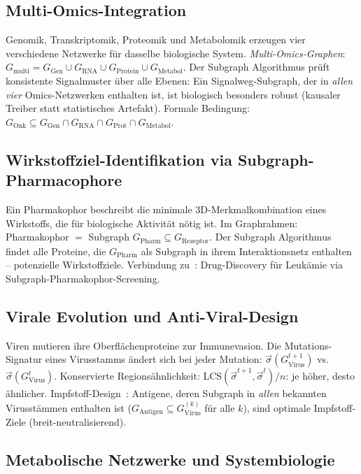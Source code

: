 ﻿\documentclass[a4paper,12pt]{article}
\theoremstyle{plain}
\theoremstyle{definition}
\theoremstyle{remark}
\newcommand{\sigvec}{\vec{\sigma}}
\begin{document}
\subsection{Multi-Omics-Integration}

Genomik, Transkriptomik, Proteomik und Metabolomik erzeugen vier
verschiedene Netzwerke f\"ur dasselbe biologische System.
\emph{Multi-Omics-Graphen}: $G_{\mathrm{multi}} = G_{\mathrm{Gen}} \cup
G_{\mathrm{RNA}} \cup G_{\mathrm{Protein}} \cup G_{\mathrm{Metabol}}$.
Der Subgraph Algorithmus pr\"uft konsistente Signalmuster \"uber alle Ebenen:
Ein Signalweg-Subgraph, der in \emph{allen vier} Omics-Netzwerken
enthalten ist, ist biologisch besonders robust (kausaler Treiber statt
statistisches Artefakt).
Formale Bedingung:
$G_{\mathrm{Onk}} \subseteq G_{\mathrm{Gen}} \cap G_{\mathrm{RNA}} \cap
G_{\mathrm{Prot}} \cap G_{\mathrm{Metabol}}$.

\subsection{Wirkstoffziel-Identifikation via Subgraph-Pharmacophore}

Ein Pharmakophor beschreibt die minimale 3D-Merkmalkombination eines
Wirkstoffs, die f\"ur biologische Aktivit\"at n\"otig ist.
Im Graphrahmen: Pharmakophor $= $ Subgraph $G_{\mathrm{Pharm}} \subseteq G_{\mathrm{Rezeptor}}$.
Der Subgraph Algorithmus findet alle Proteine, die $G_{\mathrm{Pharm}}$
als Subgraph in ihrem Interaktionsnetz enthalten -- potenzielle Wirkstoffziele.
Verbindung zu~\cite{epp2026gen,epp2026bloodc}: Drug-Discovery f\"ur
Leukämie via Subgraph-Pharmakophor-Screening.

\subsection{Virale Evolution und Anti-Viral-Design}

Viren mutieren ihre Oberfl\"achenproteine zur Immunevasion.
Die Mutations-Signatur eines Virusstamms \"andert sich bei jeder
Mutation: $\sigvec(G_{\mathrm{Virus}}^{t+1})$ vs.\ $\sigvec(G_{\mathrm{Virus}}^t)$.
Konservierte Regions\"ahnlichkeit:
$\mathrm{LCS}(\sigvec^{t+1}, \sigvec^t) / n$: je h\"oher, desto \"ahnlicher.
Impfstoff-Design~\cite{epp2026norovirus}: Antigene, deren Subgraph
in \emph{allen} bekannten Virusstämmen enthalten ist
($G_{\mathrm{Antigen}} \subseteq G_{\mathrm{Virus}}^{(k)}$ f\"ur alle $k$),
sind optimale Impfstoff-Ziele (breit-neutralisierend).

\subsection{Metabolische Netzwerke und Systembiologie}
\end{document}
